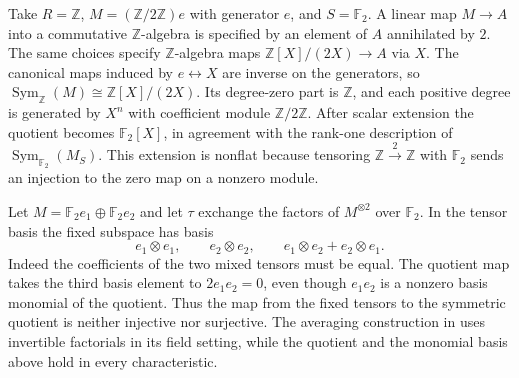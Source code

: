 \begin{example}
\label{ex:la01-symmetric-torsion}
Take \(R=\mathbb Z\), \(M=(\mathbb Z/2\mathbb Z)e\) with generator
\(e\), and \(S=\mathbb F_2\). A linear map \(M\to A\) into a
commutative \(\mathbb Z\)-algebra is specified by an element of
\(A\) annihilated by \(2\). The same choices specify
\(\mathbb Z\)-algebra maps \(\mathbb Z[X]/(2X)\to A\) via \(X\).
The canonical maps induced by \(e\leftrightarrow X\) are inverse
on the generators, so
\(\operatorname{Sym}_{\mathbb Z}(M)\cong\mathbb Z[X]/(2X)\).
Its degree-zero part is \(\mathbb Z\), and each positive degree
is generated by \(X^n\) with coefficient module \(\mathbb Z/2\mathbb Z\).
After scalar extension the quotient becomes \(\mathbb F_2[X]\),
in agreement with the rank-one description of
\(\operatorname{Sym}_{\mathbb F_2}(M_S)\).
This extension is nonflat because tensoring
\(\mathbb Z\xrightarrow{\,2\,}\mathbb Z\) with \(\mathbb F_2\)
sends an injection to the zero map on a nonzero module.
\end{example}

\begin{example}
\label{ex:la01-symmetric-char-two}
Let \(M=\mathbb F_2 e_1\oplus\mathbb F_2 e_2\) and let \(\tau\)
exchange the factors of \(M^{\otimes 2}\) over \(\mathbb F_2\).
In the tensor basis the fixed subspace has basis
\[
  e_1\otimes e_1,\qquad e_2\otimes e_2,\qquad
  e_1\otimes e_2+e_2\otimes e_1.
\]
Indeed the coefficients of the two mixed tensors must be equal.
The quotient map takes the third basis element to
\(2e_1e_2=0\), even though \(e_1e_2\) is a nonzero basis monomial
of the quotient. Thus the map from the fixed tensors to the
symmetric quotient is neither injective nor surjective. The
averaging construction in \cite[entry 15.normalization]{d05}
uses invertible factorials in its field setting, while the
quotient and the monomial basis above hold in every characteristic.
\end{example}
